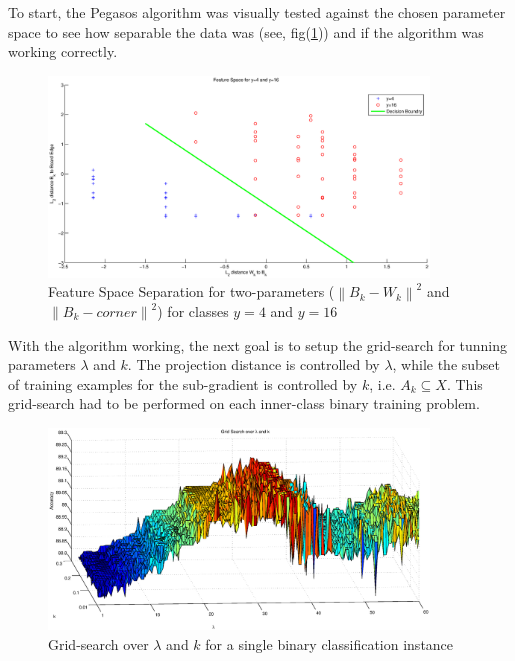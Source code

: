 \documentclass[fleqn]{article}
\begin{document}
To start, the Pegasos algorithm\cite{Shwartz:2007} was visually tested against the chosen parameter space to see how separable the data was (see, fig(\ref{fig:2D_Space})) and if the algorithm was working correctly.  
%
\begin{figure}[H]
	{\centering
		\includegraphics[trim = 10mm 8mm 10mm 0mm, clip,width=0.9\textwidth]{figs/2D_FeatureSpace}
		\caption{Feature Space Separation for two-parameters ($\left\|B_k - W_k\right\|^2$ and $\left\|B_k - corner\right\|^2$) for classes $y=4$ and $y=16$}
		\label{fig:2D_Space}
	}
\end{figure}
%
With the algorithm working, the next goal is to setup the grid-search for tunning parameters $\lambda$ and $k$.  The projection distance is controlled by $\lambda$, while the subset of training examples for the sub-gradient is controlled by $k$, i.e. $A_k \subseteq X$.  This grid-search had to be performed on each inner-class binary training problem. 
%
\begin{figure}[H]
	{\centering
		\includegraphics[trim = 10mm 8mm 10mm 0mm, clip,width=0.9\textwidth]{figs/Grid_Search}
		\caption{Grid-search over $\lambda$ and $k$ for a single binary classification instance}
		\label{fig:GridSearch}
	}
\end{figure}  
\end{document}
